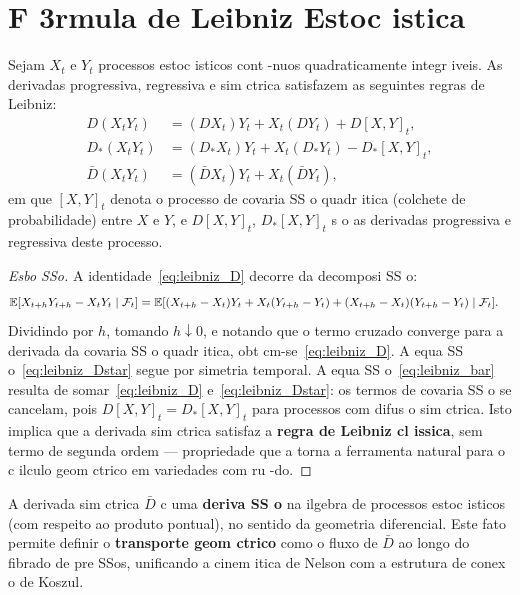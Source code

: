 \section{F 3rmula de Leibniz Estoc istica}
\label{sec:nelson_leibniz}

\begin{teo}
Sejam $X_t$ e $Y_t$ processos estoc isticos cont -nuos quadraticamente integr iveis. As derivadas progressiva, regressiva e sim ctrica satisfazem as seguintes regras de Leibniz:
\begin{align}
 D(X_t Y_t) &= (DX_t)Y_t + X_t(DY_t) + D[X,Y]_t, \label{eq:leibniz_D}\\
 D_*(X_t Y_t) &= (D_*X_t)Y_t + X_t(D_*Y_t) - D_*[X,Y]_t, \label{eq:leibniz_Dstar}\\
 \bar{D}(X_t Y_t) &= (\bar{D}X_t)Y_t + X_t(\bar{D}Y_t), \label{eq:leibniz_bar}
\end{align}
em que $[X,Y]_t$ denota o processo de covaria SS o quadr itica (colchete de probabilidade) entre $X$ e $Y$, e $D[X,Y]_t$, $D_*[X,Y]_t$ s o as derivadas progressiva e regressiva deste processo.
\end{teo}

\begin{proof}[Esbo SSo]
A identidade~\eqref{eq:leibniz_D} decorre da decomposi SS o:
\begin{align*}
 \mathbb{E}[X_{t+h}Y_{t+h} - X_tY_t\mid\mathcal{F}_t]
 &= \mathbb{E}[(X_{t+h}-X_t)Y_t + X_t(Y_{t+h}-Y_t) + (X_{t+h}-X_t)(Y_{t+h}-Y_t)\mid\mathcal{F}_t].
\end{align*}
Dividindo por $h$, tomando $h\downarrow 0$, e notando que o termo cruzado converge para a derivada da covaria SS o quadr itica, obt cm-se~\eqref{eq:leibniz_D}. A equa SS o~\eqref{eq:leibniz_Dstar} segue por simetria temporal. A equa SS o~\eqref{eq:leibniz_bar} resulta de somar~\eqref{eq:leibniz_D} e~\eqref{eq:leibniz_Dstar}: os termos de covaria SS o se cancelam, pois $D[X,Y]_t = D_*[X,Y]_t$ para processos com difus o sim ctrica. Isto implica que a derivada sim ctrica satisfaz a \textbf{regra de Leibniz cl issica}, sem termo de segunda ordem --- propriedade que a torna a ferramenta natural para o c ilculo geom ctrico em variedades com ru -do.
\end{proof}

\begin{coro}
A derivada sim ctrica $\bar{D}$ c uma \textbf{deriva SS o} na ilgebra de processos estoc isticos (com respeito ao produto pontual), no sentido da geometria diferencial. Este fato permite definir o \textbf{transporte geom ctrico} como o fluxo de $\bar{D}$ ao longo do fibrado de pre SSos, unificando a cinem itica de Nelson com a estrutura de conex o de Koszul.
\end{coro}

